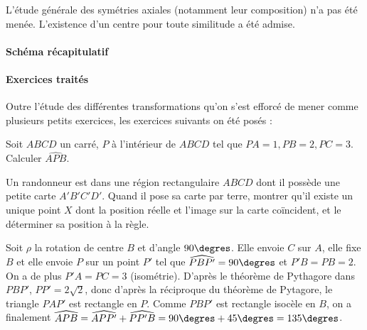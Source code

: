 L'étude générale des symétries axiales (notamment leur composition)
n'a pas été menée. L'existence d'un centre pour toute similitude a été admise.

\paragraph{Schéma récapitulatif}


\paragraph{Exercices traités}
Outre l'étude des différentes transformations qu'on s'est efforcé de mener comme plusieurs
petits exercices, les exercices suivants on été posés :

\begin{exo}
Soit $ABCD$ un carré, $P$ à l'intérieur de $ABCD$ tel que $PA=1,PB=2,PC=3$.
Calculer $\widehat{APB}$.
\end{exo}

\begin{exo}
Un randonneur est dans une région rectangulaire $ABCD$ dont il possède une petite
carte $A'B'C'D'$. Quand il pose sa carte par terre, montrer qu'il existe un unique
point $X$ dont la position réelle et l'image sur la carte coïncident, et le déterminer
sa position à la règle.  
\end{exo}

\begin{sol}
Soit $\rho$ la rotation de centre $B$ et d'angle $90\degres$. Elle envoie $C$ sur $A$,
elle fixe $B$ et elle envoie $P$ sur un point $P'$ tel que $\widehat{PBP'}=90\degres$
et $P'B=PB=2$. On a de plus $P'A=PC=3$ (isométrie). D'après le théorème de Pythagore
dans $PBP'$, $PP'=2\sqrt{2}$, donc d'après la réciproque du théorème de Pytagore, 
le triangle $PAP'$ est rectangle en $P$. Comme $PBP'$ est rectangle isocèle en $B$,
on a finalement $\widehat{APB}=\widehat{APP'}+\widehat{PP'B}=90\degres+45\degres=135\degres$. 
\end{sol}


